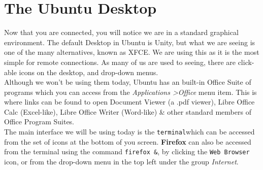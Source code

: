 \section{The Ubuntu Desktop}
\begin{note}
Now that you are connected, you will notice we are in a standard graphical environment.
The default Desktop in Ubuntu is Unity, but what we are seeing is one of the many alternatives, known as XFCE.
We are using this as it is the most simple for remote connections.
As many of us are used to seeing, there are click-able icons on the desktop, and drop-down menus. \\

Although we won't be using them today, Ubuntu has an built-in Office Suite of
programs which you can access from the \textit{Applications \textgreater Office} menu item.
This is where links can be found to open Document Viewer (a .pdf viewer), Libre Office Calc (Excel-like), Libre Office Writer (Word-like) \& other standard members of Office Program Suites. \\

The main interface we will be using today is the \texttt{terminal}which can be accessed from the set of icons at the bottom of you screen.
\textbf{Firefox} can also be accessed from the terminal using the command \texttt{firefox \&},  by clicking the \texttt{Web Browser} icon, or from the drop-down menu in the top left under the group \textit{Internet}.

\end{note}

